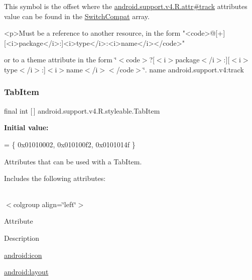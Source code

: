 This symbol is the offset where the \hyperlink{classandroid_1_1support_1_1v4_1_1R_1_1attr_ad9d65c0fbafbf126efc40c5c1d6a467b}{android.\+support.\+v4.\+R.\+attr\#track} attribute\textquotesingle{}s value can be found in the \hyperlink{classandroid_1_1support_1_1v4_1_1R_1_1styleable_a3b46a9ea84acdcc1d9e88a54fc6f685e}{Switch\+Compat} array.

\begin{DoxyVerb}      <p>Must be a reference to another resource, in the form "<code>@[+][<i>package</i>:]<i>type</i>:<i>name</i></code>"
\end{DoxyVerb}
 or to a theme attribute in the form \char`\"{}$<$code$>$?\mbox{[}$<$i$>$package$<$/i$>$\+:\mbox{]}\mbox{[}$<$i$>$type$<$/i$>$\+:\mbox{]}$<$i$>$name$<$/i$>$$<$/code$>$\char`\"{}.  name android.\+support.\+v4\+:track \mbox{\label{classandroid_1_1support_1_1v4_1_1R_1_1styleable_ad680ed3459bf81f422f0dcae8c50dfc3}} 
\subsubsection{\texorpdfstring{Tab\+Item}{TabItem}}
{\footnotesize\ttfamily final int \mbox{[}$\,$\mbox{]} android.\+support.\+v4.\+R.\+styleable.\+Tab\+Item\hspace{0.3cm}{\ttfamily [static]}}

{\bfseries Initial value\+:}
\begin{DoxyCode}
= \{
            0x01010002, 0x010100f2, 0x0101014f
        \}
\end{DoxyCode}
Attributes that can be used with a Tab\+Item. 

Includes the following attributes\+:

\tabulinesep=1mm
\begin{longtabu} spread 0pt [c]{*{0}{|X[-1]}|}
\hline
\end{longtabu}
$<$colgroup align=\char`\"{}left\char`\"{}$>$ 

Attribute

Description 

{\ttfamily \hyperlink{classandroid_1_1support_1_1v4_1_1R_1_1styleable_a691f8166d05ca47d403a871ffcfc8338}{android\+:icon}}

{\ttfamily \hyperlink{classandroid_1_1support_1_1v4_1_1R_1_1styleable_a9f91c8afe073d31917ea616c09636f9b}{android\+:layout}}

